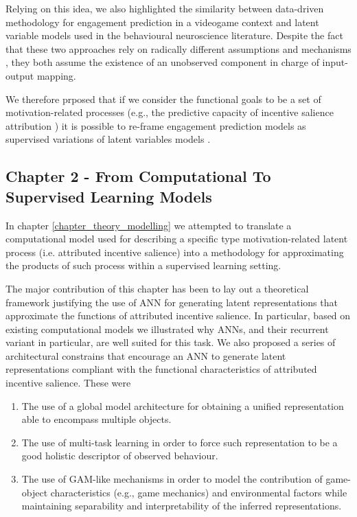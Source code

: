 Relying on this idea, we also highlighted the similarity between data-driven methodology for engagement prediction in a videogame context and latent variable models used in the behavioural neuroscience literature. Despite the fact that these two approaches rely on radically different assumptions and mechanisms \cite{murphy2022probabilistic}, they both assume the existence of an unobserved component in charge of input-output mapping.

We therefore prposed that if we consider the functional goals to be a set of motivation-related processes (e.g., the predictive capacity of incentive salience attribution \cite{berridge2004motivation}) it is possible to re-frame engagement prediction models as supervised variations of latent variables models \cite{luxem2020identifying, mccullough2021unsupervised}.

\subsection{Chapter 2 - From Computational To Supervised Learning Models}
\label{discussion_chapter_two}
In chapter \ref{chapter_theory_modelling} we attempted to translate a computational model used for describing a specific type motivation-related latent process (i.e. attributed incentive salience) into a methodology for approximating the products of such process within a supervised learning setting.

The major contribution of this chapter has been to lay out a theoretical framework justifying the use of ANN for generating latent representations that approximate the functions of attributed incentive salience. In particular, based on existing computational models \cite{mcclure2003computational, zhang2009neural} we illustrated why ANNs, and their recurrent variant in particular, are well suited for this task. We also proposed a series of architectural constrains that encourage an ANN to generate latent representations compliant with the functional characteristics of attributed incentive salience. These were

\begin{enumerate}
    \item The use of a global model architecture for obtaining a unified representation able to encompass multiple objects.
    \item The use of multi-task learning in order to force such representation to be a good holistic descriptor of observed behaviour.
    \item The use of GAM-like mechanisms in order to model the contribution of game-object characteristics (e.g., game mechanics) and environmental factors while maintaining separability and interpretability of the inferred representations.
\end{enumerate}

